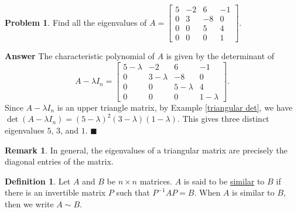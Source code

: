 \documentclass[12pt,letterpaper]{book}
\numberwithin{equation}{section}
\theoremstyle{definition}
\newtheorem{defi}[thm]{\textbf{Definition}}
\newtheorem{problem}[thm]{\textbf{Problem}}
\newtheorem{remark}[thm]{\textbf{Remark}}
\newenvironment{answer}{\noindent\textbf{Answer}}{\hfill$\blacksquare$\vspace{0.1in}}
\begin{document}
\begin{problem} Find all the eigenvalues of
$A=\left[\begin{array}{rrrr} 5 & -2 & 6 & -1 \\ 0 & 3 & -8 & 0 \\
0 & 0 & 5 & 4 \\ 0 & 0 & 0 & 1 \end{array}\right]$.
\end{problem}

\begin{answer}
The characteristic polynomial of $A$ is given by the determinant of
$$A-\lambda I_n=\left[\begin{array}{cccc} 5-\lambda & -2 & 6 & -1 \\ 0 & 3-\lambda & -8 & 0 \\
0 & 0 & 5-\lambda & 4 \\ 0 & 0 & 0 & 1-\lambda \end{array}\right].$$
Since $A-\lambda I_n$ is an upper triangle matrix, by Example \ref{triangular det}, we have $\det(A-\lambda I_n)=(5-\lambda)^2(3-\lambda)(1-\lambda)$. This gives three distinct eigenvalues $5$, $3$, and $1$.
\end{answer}

\begin{remark}
In general, the eigenvalues of a triangular matrix are precisely the
diagonal entries of the matrix.
\end{remark}

\begin{defi} Let $A$ and $B$ be $n\times n$ matrices. $A$ is
said to be \underline{similar} to $B$ if there is an invertible
matrix $P$ such that $P^{-1}AP=B$. When $A$ is similar to $B$, then we write $A\sim B$.
\end{defi}
\end{document}
